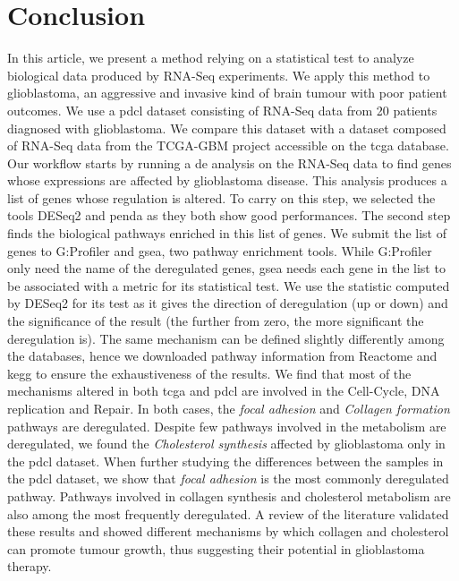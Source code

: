 \section{Conclusion}

In this article, we present a method relying on a statistical test to analyze biological data produced by RNA-Seq experiments.
We apply this method to glioblastoma, an aggressive and invasive kind of brain tumour with poor patient outcomes.
We use a \acrfull{pdcl} dataset consisting of RNA-Seq data from 20 patients diagnosed with glioblastoma.
We compare this dataset with a dataset composed of RNA-Seq data from the TCGA-GBM project accessible on the \acrshort{tcga} database.
Our workflow starts by running a \acrlong{de} analysis on the RNA-Seq data to find genes whose expressions are affected by glioblastoma disease.
This analysis produces a list of genes whose regulation is altered.
To carry on this step, we selected the tools DESeq2 and \acrshort{penda} as they both show good performances.
The second step finds the biological pathways enriched in this list of genes.
We submit the list of genes to G:Profiler and \acrshort{gsea}, two pathway enrichment tools.
While G:Profiler only need the name of the deregulated genes, \acrshort{gsea} needs each gene in the list to be associated with a metric for its statistical test.
We use the statistic computed by DESeq2 for its test as it gives the direction of deregulation (up or down) and the significance of the result (the further from zero, the more significant the deregulation is).
The same mechanism can be defined slightly differently among the databases, hence we downloaded pathway information from Reactome and \acrshort{kegg} to ensure the exhaustiveness of the results.
We find that most of the mechanisms altered in both \acrshort{tcga} and \acrshort{pdcl} are involved in the Cell-Cycle, DNA replication and Repair.
In both cases, the \textit{focal adhesion} and \textit{Collagen formation} pathways are deregulated.
Despite few pathways involved in the metabolism are deregulated, we found the \textit{Cholesterol synthesis} affected by glioblastoma only in the \acrshort{pdcl} dataset.
When further studying the differences between the samples in the \acrshort{pdcl} dataset, we show that \textit{focal adhesion} is the most commonly deregulated pathway.
Pathways involved in collagen synthesis and cholesterol metabolism are also among the most frequently deregulated.
A review of the literature validated these results and showed different mechanisms by which collagen and cholesterol can promote tumour growth, thus suggesting their potential in glioblastoma therapy.
